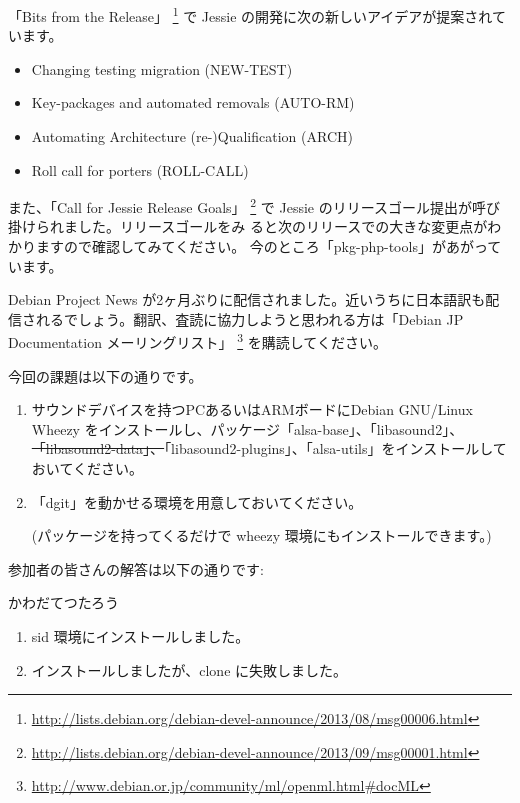 \documentclass[mingoth,a4paper]{jsarticle}
\begin{document}
「Bits from the Release」
\footnote{\url{http://lists.debian.org/debian-devel-announce/2013/08/msg00006.html}}
で Jessie の開発に次の新しいアイデアが提案されています。
\begin{screen}
  \begin{itemize}
  \item Changing testing migration (NEW-TEST)
  \item Key-packages and automated removals (AUTO-RM)
  \item Automating Architecture (re-)Qualification (ARCH)
  \item Roll call for porters (ROLL-CALL)
  \end{itemize}
\end{screen}

また、「Call for Jessie Release Goals」
\footnote{\url{http://lists.debian.org/debian-devel-announce/2013/09/msg00001.html}}
で Jessie のリリースゴール提出が呼び掛けられました。リリースゴールをみ
ると次のリリースでの大きな変更点がわかりますので確認してみてください。
今のところ「pkg-php-tools」があがっています。

Debian Project News が2ヶ月ぶりに配信されました。近いうちに日本語訳も配
信されるでしょう。翻訳、査読に協力しようと思われる方は「Debian JP Documentation メーリングリスト」
\footnote{\url{http://www.debian.or.jp/community/ml/openml.html\#docML}}
を購読してください。


今回の課題は以下の通りです。
\begin{screen}
  \begin{enumerate}
  \item サウンドデバイスを持つPCあるいはARMボードにDebian GNU/Linux Wheezy をインストールし、パッケージ「alsa-base」、「libasound2」、
    \sout{「libasound2-data」、}「libasound2-plugins」、「alsa-utils」をインストールしておいてください。

  \item 「dgit」を動かせる環境を用意しておいてください。

     (パッケージを持ってくるだけで wheezy 環境にもインストールできます。)

  \end{enumerate}
\end{screen}

参加者の皆さんの解答は以下の通りです:

\begin{prework}{ かわだてつたろう }
  \begin{enumerate}
  \item  sid 環境にインストールしました。
  \item インストールしましたが、clone に失敗しました。
  \end{enumerate}
\end{prework}
\end{document}
